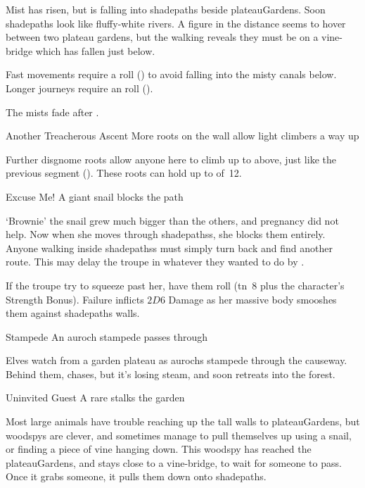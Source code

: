 \begin{boxtext}
  Mist has risen, but is falling into \gls{shadepaths} beside \gls{plateauGardens}.
  Soon \gls{shadepaths} look like fluffy-white rivers.
  A figure in the distance seems to hover between two plateau gardens, but the walking reveals they must be on a vine-bridge which has fallen just below.
\end{boxtext}

Fast movements require a  roll (\tn[8]) to avoid falling into the misty canals below.
Longer journeys require an  roll (\tn[10]).

The mists fade after .

{Another Treacherous Ascent}%
{More roots on the wall allow light climbers a way up}%

Further \gls{disgnome} roots allow anyone here to climb up to  above, just like the previous \gls{segment} ().
These roots can hold up to  of~12.


{Excuse Me!}%
{A giant snail blocks the path}%

`Brownie' the snail grew much bigger than the others, and pregnancy did not help.
Now when she moves through \glspl{shadepaths}, she blocks them entirely.
Anyone walking inside \glspl{shadepaths} must simply turn back and find another route.
This may delay the troupe in whatever they wanted to do by .

If the troupe try to squeeze past her, have them roll  (\gls{tn}~8 plus the character's Strength Bonus).
Failure inflicts $2D6$ Damage as her massive body smooshes them against \gls{shadepaths} walls.

{Stampede}%
{An auroch stampede passes through}%

Elves watch from a garden plateau as aurochs stampede through the causeway.
Behind them,  chases, but it's losing steam, and soon retreats into the forest.

{Uninvited Guest}%
{A rare  stalks the garden}%

Most large animals have trouble reaching up the tall walls to \gls{plateauGardens}, but \glspl{woodspy} are clever, and sometimes manage to pull themselves up using a snail, or finding a piece of vine hanging down.
This \gls{woodspy} has reached the \gls{plateauGardens}, and stays close to a vine-bridge, to wait for someone to pass.
Once it grabs someone, it pulls them down onto \gls{shadepaths}.

